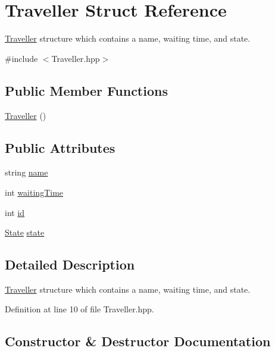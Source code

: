 \hypertarget{structTraveller}{}\section{Traveller Struct Reference}
\label{structTraveller}


\hyperlink{structTraveller}{Traveller} structure which contains a name, waiting time, and state.  




{\ttfamily \#include $<$Traveller.\+hpp$>$}

\subsection*{Public Member Functions}
\begin{DoxyCompactItemize}
\item 
\hyperlink{structTraveller_aac8fb04e75fbbb722454513a6a11fbe9}{Traveller} ()
\end{DoxyCompactItemize}
\subsection*{Public Attributes}
\begin{DoxyCompactItemize}
\item 
string \hyperlink{structTraveller_aff70abc8ab515e05dc122cb729af5196}{name}
\item 
int \hyperlink{structTraveller_a7b7690d3fc39f3cfda9ede916feb17c6}{waiting\+Time}
\item 
int \hyperlink{structTraveller_a50318826417577279e514222786909a5}{id}
\item 
\hyperlink{States_8hpp_a5d74787dedbc4e11c1ab15bf487e61f8}{State} \hyperlink{structTraveller_a029215215a4f7630f2b7cac6e433a0ff}{state}
\end{DoxyCompactItemize}


\subsection{Detailed Description}
\hyperlink{structTraveller}{Traveller} structure which contains a name, waiting time, and state. 

Definition at line 10 of file Traveller.\+hpp.



\subsection{Constructor \& Destructor Documentation}
